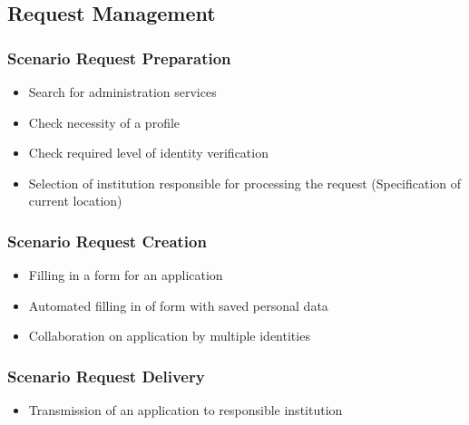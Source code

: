 \documentclass[
     12pt,         %
     a4paper,      %
     BCOR=10mm,version=first,     %
     DIV=14,version=first,        %
     ]{scrreprt}
\begin{document}
\subsection{Request Management}

\subsubsection{Scenario Request Preparation}
\begin{itemize}
    \item Search for administration services
    \item Check necessity of a profile
    \item Check required level of identity verification
    \item Selection of institution responsible for processing the request (Specification of current location)
\end{itemize}

\subsubsection{Scenario Request Creation}
\begin{itemize}
    \item Filling in a form for an application
    \item Automated filling in of form with saved personal data
    \item Collaboration on application by multiple identities
\end{itemize}

\subsubsection{Scenario Request Delivery}
\begin{itemize}
    \item Transmission of an application to responsible institution
\end{itemize}
\end{document}
